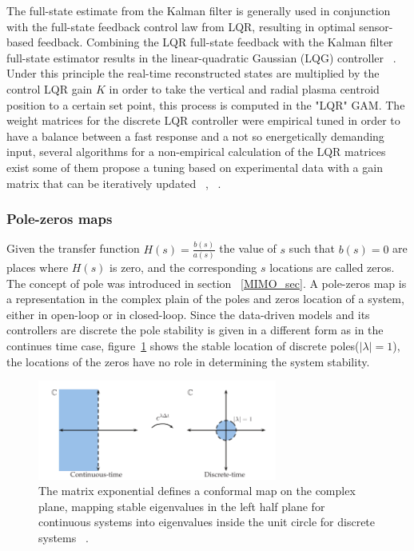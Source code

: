The full-state estimate from the Kalman filter is generally used in conjunction with the
full-state feedback control law from LQR, resulting in optimal sensor-based feedback. Combining the LQR full-state feedback with the Kalman filter full-state estimator results in the linear-quadratic Gaussian (LQG) controller ~\cite[Chapter~8]{DataDriven2019}. Under this principle the real-time reconstructed states are multiplied by the control LQR gain $K$ in order to take the  vertical and radial plasma centroid position to a certain set point, this process is computed in the "LQR" GAM. The weight matrices for the discrete LQR controller were empirical tuned in order to have a balance between a fast response and a not so energetically demanding input, several algorithms for a non-empirical calculation of the LQR matrices exist some of them propose a tuning based on experimental data with a gain matrix that can be iteratively updated ~\cite[Chapter~9]{Franklin1998}, ~\cite{Trimpe2014}.
\smallskip



\subsubsection{Pole-zeros maps}



Given the transfer function $H(s)=\frac{b(s)}{a(s)}$ the value of $s$ such that $b(s)=0$ are places where $H(s)$ is zero, and the corresponding $s$ locations are called zeros. The  concept of pole  was introduced in section ~\ref{MIMO_sec}.  A pole-zeros map is a representation in the complex plain  of the poles and zeros location of a system, either  in open-loop or in closed-loop. Since the data-driven models and its controllers are discrete the pole stability is given in a different form as in the continues time case,  figure~\ref{PoleZeroMap} shows the stable location of discrete poles($|\lambda|=1$),  the locations of the zeros have no role in determining the system stability.\smallskip



\begin{figure}[h]
	\centering
	\includegraphics[width=0.7\textwidth]{Chp5/PolesZerosMaps.png}
	
	\caption{ The matrix exponential defines a conformal map on the complex plane, mapping stable eigenvalues in the left half plane for continuous systems into eigenvalues inside the unit circle for discrete systems ~\cite[Chapter~8]{DataDriven2019}\label{PoleZeroMap}.}
\end{figure}

